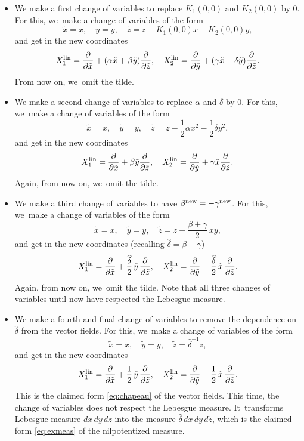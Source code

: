 \documentclass[JEP,XML,SOM,Unicode,published]{cedram}
\newcommand{\lin}{\textup{lin}}
\newcommand{\new}{\textup{new}}
\theoremstyle{definition}
\newcommand{\1}{\mathbbm{1}}
\begin{document}
\begin{itemize}
\item We make a first change of variables to replace $K_1(0,0)$ and $K_2(0,0)$ by $0$.
For this, we~make a change of variables of the form
\[
\tilde x = x,\quad
\tilde y =y,\quad \tilde z = z - K_1(0,0) x - K_2(0,0) y,
\]
and get in the new coordinates
\[
X_1^\lin= \frac{\partial}{\partial \tilde x} + (\alpha \tilde x + \beta \tilde y) \frac{\partial}{\partial \tilde z},\quad
X_2^\lin= \frac{\partial}{\partial \tilde y} +(\gamma \tilde x + \delta \tilde y) \frac{\partial}{\partial \tilde z}.
\]
From now on, we~omit the tilde.
\item We make a second change of variables to replace $\alpha$ and $\delta$ by $0$.
For this, we~make a change of variables of the form
\[
\tilde x = x,\quad \tilde y =y,\quad \tilde z = z - \frac 12 \alpha x^2 - \frac 12 \delta y^2,
\]
and get in the new coordinates
\[
X_1^\lin= \frac{\partial}{\partial \tilde x} + \beta \tilde y \frac{\partial}{\partial \tilde z},\quad
X_2^\lin= \frac{\partial}{\partial \tilde y} + \gamma \tilde x \frac{\partial}{\partial \tilde z}.
\]
Again, from now on, we~omit the tilde.
\item We make a third change of variables to have $\beta^\new = - \gamma^\new$.
For this, we~make a change of variables of the form
\[
\tilde x = x,\quad \tilde y =y,\quad \tilde z = z - \frac{\beta+\gamma}2\,xy,
\]
and get in the new coordinates (recalling $\widehat\delta = \beta - \gamma$)
\[
X_1^\lin= \frac{\partial}{\partial \tilde x} + \frac{\widehat\delta}{2}\,\tilde y\,\frac{\partial}{\partial \tilde z},\quad
X_2^\lin= \frac{\partial}{\partial \tilde y} - \frac{\widehat\delta}{2}\,\tilde x\,\frac{\partial}{\partial \tilde z}.
\]
Again, from now on, we~omit the tilde.
Note that all three changes of variables until now have respected the Lebesgue measure.
\item We make a fourth and final change of variables to remove the dependence on $\widehat\delta$ from the vector fields.
For this, we~make a change of variables of the form
\[
\tilde x = x,\quad \tilde y =y,\quad \tilde z = \widehat \delta^{-1} z,
\]
and get in the new coordinates
\[
X_1^\lin= \frac{\partial}{\partial \tilde x} + \frac{1}{2}\,\tilde y\,\frac{\partial}{\partial \tilde z},\quad
X_2^\lin= \frac{\partial}{\partial \tilde y} - \frac{1}{2}\,\tilde x\,\frac{\partial}{\partial \tilde z}.
\]
This is the claimed form \eqref{eq:chapeau} of the vector fields.
This time, the change of variables does not respect the Lebesgue measure. It~transforms Lebesgue measure $dx\,dy\,dz$ into the measure $\widehat\delta\,d\tilde x\,d\tilde y\,d\tilde z$, which is the claimed form \eqref{eq:exmeas} of the nilpotentized measure.
\end{itemize}
\end{document}
